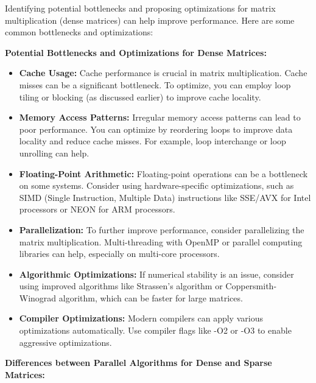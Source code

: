 \documentclass{article}
\begin{document}
Identifying potential bottlenecks and proposing optimizations for matrix multiplication (dense matrices) can help improve performance. Here are some common bottlenecks and optimizations:

\textbf{Potential Bottlenecks and Optimizations for Dense Matrices:}

\begin{itemize}
    \item \textbf{Cache Usage:} Cache performance is crucial in matrix multiplication. Cache misses can be a significant bottleneck. To optimize, you can employ loop tiling or blocking (as discussed earlier) to improve cache locality.
    \item \textbf{Memory Access Patterns:} Irregular memory access patterns can lead to poor performance. You can optimize by reordering loops to improve data locality and reduce cache misses. For example, loop interchange or loop unrolling can help.
    \item \textbf{Floating-Point Arithmetic:} Floating-point operations can be a bottleneck on some systems. Consider using hardware-specific optimizations, such as SIMD (Single Instruction, Multiple Data) instructions like SSE/AVX for Intel processors or NEON for ARM processors.
    \item \textbf{Parallelization:} To further improve performance, consider parallelizing the matrix multiplication. Multi-threading with OpenMP or parallel computing libraries can help, especially on multi-core processors.
    \item \textbf{Algorithmic Optimizations:} If numerical stability is an issue, consider using improved algorithms like Strassen's algorithm or Coppersmith-Winograd algorithm, which can be faster for large matrices.
    \item \textbf{Compiler Optimizations:} Modern compilers can apply various optimizations automatically. Use compiler flags like -O2 or -O3 to enable aggressive optimizations.
\end{itemize}

\textbf{Differences between Parallel Algorithms for Dense and Sparse Matrices:}
\end{document}
